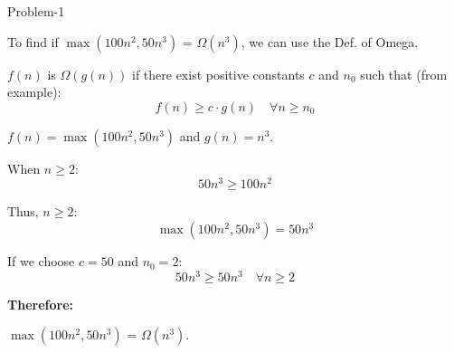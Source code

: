 \begin{problem}{}{Problem-1}
\begin{enumerate}
\begin{enumerate}[label=(\alph*)]
		To find if \(\max(100n^2, 50n^3)\) = \(\Omega(n^3)\), we can use the Def. of Omega.
		
		\(f(n)\) is \(\Omega(g(n))\) if there exist positive constants \(c\) and \(n_0\) such that (from example):
		\[
		f(n) \geq c \cdot g(n) \quad \forall n \geq n_0 
		\]
		
		\(f(n) = \max(100n^2, 50n^3)\) and \(g(n) = n^3\).
		
		When \(n \geq 2\):
		\[
		50n^3 \geq 100n^2 
		\]
		
		Thus, \(n \geq 2\):
		\[
		\max(100n^2, 50n^3) = 50n^3
		\]
		
		If we choose \(c = 50\) and \(n_0 = 2\):
		\[
		50n^3 \geq 50n^3 \quad \forall n \geq 2
		\]
		
		\textbf{Therefore:}
		
		\(\max(100n^2, 50n^3)\) = \(\Omega(n^3)\).
			
		\end{enumerate}
	\end{enumerate}
\end{problem}
